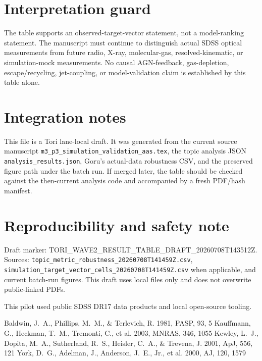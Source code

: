\documentclass[twocolumn]{aastex631}
\begin{document}
    \section{Interpretation guard}
    The table supports an observed-target-vector statement, not a model-ranking statement.  The manuscript must continue to distinguish actual SDSS optical measurements from future radio, X-ray, molecular-gas, resolved-kinematic, or simulation-mock measurements.  No causal AGN-feedback, gas-depletion, escape/recycling, jet-coupling, or model-validation claim is established by this table alone.

    \section{Integration notes}
    This file is a Tori lane-local draft.  It was generated from the current source manuscript \texttt{m3\_p3\_simulation\_validation\_aas.tex}, the topic analysis JSON \texttt{analysis\_results.json}, Goru's actual-data robustness CSV, and the preserved figure path under the batch run.  If merged later, the table should be checked against the then-current analysis code and accompanied by a fresh PDF/hash manifest.

    \section*{Reproducibility and safety note}
    Draft marker: TORI\_WAVE2\_RESULT\_TABLE\_DRAFT\_20260708T143512Z.  Sources: \texttt{topic\_metric\_robustness\_20260708T141459Z.csv}, \texttt{simulation\_target\_vector\_cells\_20260708T141459Z.csv} when applicable, and current batch-run figures.  This draft uses local files only and does not overwrite public-linked PDFs.

    \acknowledgments
    This pilot used public SDSS DR17 data products and local open-source tooling.

    \begin{thebibliography}{}
     Baldwin, J.~A., Phillips, M.~M., \& Terlevich, R. 1981, PASP, 93, 5
     Kauffmann, G., Heckman, T.~M., Tremonti, C., et al. 2003, MNRAS, 346, 1055
     Kewley, L.~J., Dopita, M.~A., Sutherland, R.~S., Heisler, C.~A., \& Trevena, J. 2001, ApJ, 556, 121
     York, D.~G., Adelman, J., Anderson, J.~E., Jr., et al. 2000, AJ, 120, 1579
    \end{thebibliography}

    
\end{document}
